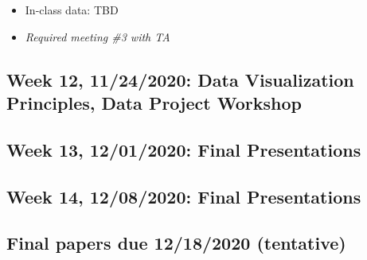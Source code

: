 \documentclass[11pt,]{article}
\providecommand{\tightlist}{%
  \setlength{\itemsep}{0pt}\setlength{\parskip}{0pt}}
\begin{document}
\begin{itemize}
\tightlist
\item
  In-class data: TBD
\item
  \emph{Required meeting \#3 with TA} \medskip
\end{itemize}

\hypertarget{week-12-11242020-data-visualization-principles-data-project-workshop}{%
\subsection{Week 12, 11/24/2020: Data Visualization Principles, Data
Project
Workshop}\label{week-12-11242020-data-visualization-principles-data-project-workshop}}

\medskip

\hypertarget{week-13-12012020-final-presentations}{%
\subsection{Week 13, 12/01/2020: Final
Presentations}\label{week-13-12012020-final-presentations}}

\medskip

\hypertarget{week-14-12082020-final-presentations}{%
\subsection{Week 14, 12/08/2020: Final
Presentations}\label{week-14-12082020-final-presentations}}

\medskip

\hypertarget{final-papers-due-12182020-tentative}{%
\subsection{Final papers due 12/18/2020
(tentative)}\label{final-papers-due-12182020-tentative}}
\end{document}
